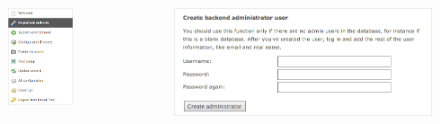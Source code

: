 \begin{frame}[fragile]
	\begin{columns}[T]
		\begin{column}{.3\textwidth}
			\begin{figure}\vspace*{-0.4cm}
				\includegraphics[width=0.7\linewidth]{Images/InstallTool/ImportantActions.png}
			\end{figure}
		\end{column}
		\begin{column}{.7\textwidth}
			\begin{figure}\vspace*{-0.4cm}
				\includegraphics[width=0.9\linewidth]{Images/InstallTool/SaltedPasswords.png}
			\end{figure}
		\end{column}
	\end{columns}

\end{frame}

